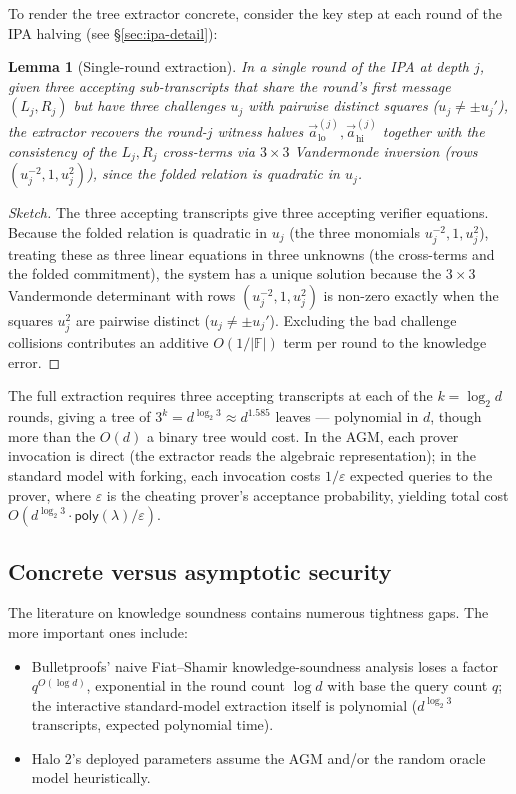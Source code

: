 \documentclass[11pt,a4paper]{article}
\newtheorem{lemma}[theorem]{Lemma}
\theoremstyle{definition}
\newcommand{\F}{\mathbb{F}}
\begin{document}
To render the tree extractor concrete, consider the key step at each round of the
IPA halving (see \S\ref{sec:ipa-detail}):

\begin{lemma}[Single-round extraction]\label{lem:single-round}
In a single round of the IPA at depth $j$, given three accepting
sub-transcripts that share the round's first message $(L_j, R_j)$ but
have three challenges $u_j$ with pairwise distinct squares
($u_j \ne \pm u_j'$), the extractor recovers the round-$j$
witness halves $\vec{a}_{\mathrm{lo}}^{(j)}, \vec{a}_{\mathrm{hi}}^{(j)}$
together with the consistency of the $L_j, R_j$ cross-terms via $3 \times 3$
Vandermonde inversion (rows $(u_j^{-2}, 1, u_j^2)$), since the folded
relation is quadratic in $u_j$.
\end{lemma}

\begin{proof}[Sketch]
The three accepting transcripts give three accepting verifier equations.
Because the folded relation is quadratic in $u_j$ (the three monomials
$u_j^{-2}, 1, u_j^2$), treating these as three linear equations in three
unknowns (the cross-terms and the folded commitment), the system has a
unique solution because the $3 \times 3$ Vandermonde determinant with rows
$(u_j^{-2}, 1, u_j^2)$ is non-zero exactly when the squares $u_j^2$ are
pairwise distinct ($u_j \ne \pm u_j'$). Excluding the bad challenge collisions contributes an additive
$O(1/|\F|)$ term per round to the knowledge error.
\end{proof}

The full extraction requires three accepting transcripts at each of the
$k = \log_2 d$ rounds, giving a tree of $3^k = d^{\log_2 3} \approx d^{1.585}$
leaves --- polynomial in $d$, though more than the $O(d)$ a binary tree
would cost. In the AGM, each prover invocation is direct (the extractor
reads the algebraic representation); in the standard model with forking,
each invocation costs $1/\varepsilon$ expected queries to the prover,
where $\varepsilon$ is the cheating prover's acceptance probability,
yielding total cost $O(d^{\log_2 3} \cdot \mathsf{poly}(\lambda) / \varepsilon)$.

\subsection{Concrete versus asymptotic security}

The literature on knowledge soundness contains numerous tightness gaps. The
more important ones include:
\begin{itemize}[leftmargin=*]
\item Bulletproofs' naive Fiat--Shamir knowledge-soundness analysis
loses a factor $q^{O(\log d)}$, exponential in the round count $\log d$
with base the query count $q$; the interactive standard-model extraction
itself is polynomial ($d^{\log_2 3}$ transcripts, expected polynomial
time).
\item Halo 2's deployed parameters assume the AGM and/or the random oracle
model heuristically.
\end{itemize}
\end{document}
